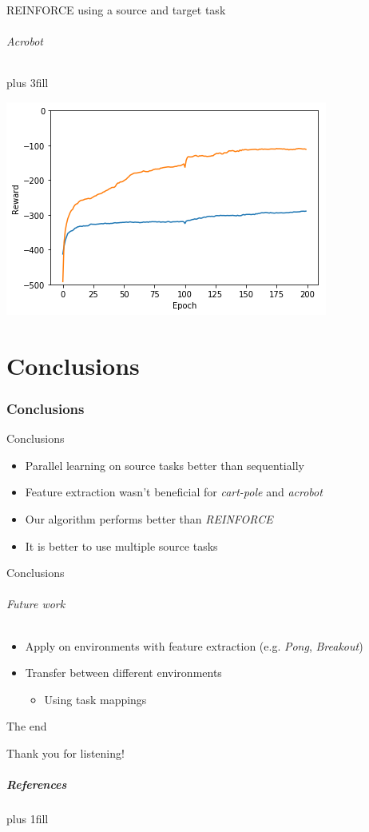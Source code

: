 \documentclass{beamer}
\let\oldfootnotesize\footnotesize
\renewcommand*{\footnotesize}{\oldfootnotesize\tiny}
\begin{document}
\begin{frame}[fragile]{REINFORCE using a source and target task}
\framesubtitle{Acrobot}
\vskip0pt plus 3fill
\begin{center}
    \includegraphics[width=.8\linewidth]{results/Acrobot/reinforce_2tasks.png}
\end{center}
\end{frame}

\part{Conclusions}
\section{Conclusions}
\begin{frame}[fragile]{Conclusions}
\begin{itemize}
    \item Parallel learning on source tasks better than sequentially
    \item Feature extraction wasn't beneficial for \textit{cart-pole} and \textit{acrobot}
    \item Our algorithm performs better than \textit{REINFORCE}
    \item It is better to use multiple source tasks
\end{itemize}
\end{frame}


\begin{frame}[fragile]{Conclusions}
\framesubtitle{Future work}
\begin{itemize}
    \item Apply on environments with feature extraction (e.g. \textit{Pong}, \textit{Breakout})
    \item Transfer between different environments
    \begin{itemize}
        \item Using task mappings
    \end{itemize}
\end{itemize}
\end{frame}

\begin{frame}[c]{The end}
\begin{center}
    \color{vubbleu} \LARGE\vubfont Thank you for listening!
\end{center}
\end{frame}

\begin{frame}[allowframebreaks]
\frametitle{References}
\vskip0pt plus 1fill
\footnotesize{


}
\end{frame}
\end{document}
